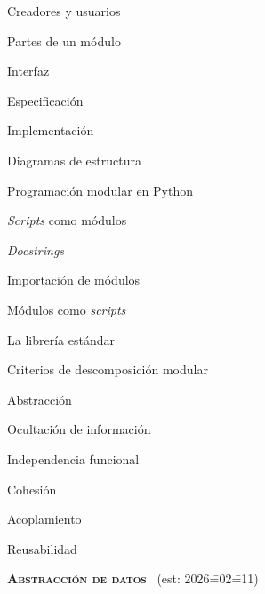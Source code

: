 \begin{longenum}
\begin{longenum}
\begin{longenum}
            \item Creadores y usuarios
            \item Partes de un módulo
            \begin{longenum}
                \item Interfaz
                \begin{longenum}
                    \item Especificación
                \end{longenum}
                \item Implementación
            \end{longenum}
            \item Diagramas de estructura
        \end{longenum}
        \item Programación modular en Python
        \begin{longenum}
            \item \textit{Scripts} como módulos
            \begin{longenum}
                \item \textit{Docstrings}
            \end{longenum}
            \item Importación de módulos
            \item Módulos como \textit{scripts}
            \item La librería estándar
        \end{longenum}
        \item Criterios de descomposición modular
        \begin{longenum}
            \item Abstracción
            \item Ocultación de información
            \item Independencia funcional
            \begin{longenum}
                \item Cohesión
                \item Acoplamiento
            \end{longenum}
            \item Reusabilidad
        \end{longenum}
    \end{longenum}
    \item \textbf{\textsc{Abstracción de datos}} \ (est: 2026\==02\==11)
    \begin{longenum}

\end{longenum}
\end{longenum}
